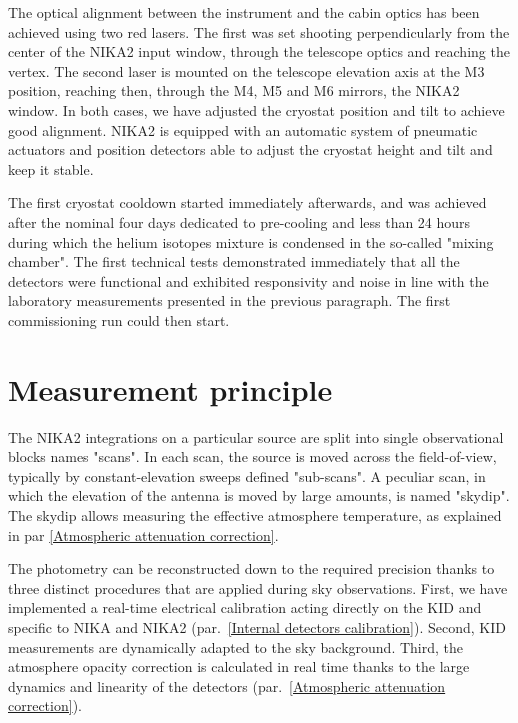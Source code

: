 \documentclass[]{aa} %
\begin{document}
The optical alignment between the instrument and the cabin optics has been achieved using two red lasers. The first was set shooting perpendicularly from the center of the NIKA2 input window, through the telescope optics and reaching the vertex. The second laser is mounted on the telescope elevation axis at the M3 position, reaching then, through the M4, M5 and M6 mirrors, the NIKA2 window. In both cases, we have adjusted the cryostat position and tilt to achieve good alignment. NIKA2 is equipped with an automatic system of pneumatic actuators and position detectors able to adjust the cryostat height and tilt and keep it stable. 

The first cryostat cooldown started immediately afterwards, and was achieved after the nominal four days dedicated to pre-cooling and less than 24 hours during which the helium isotopes mixture is condensed in the so-called "mixing chamber". The first technical tests demonstrated immediately that all the detectors were functional and exhibited responsivity and noise in line with the laboratory measurements presented in the previous paragraph. The first commissioning run could then start.







\section{Measurement principle}

The NIKA2 integrations on a particular source are split into single observational blocks names "scans". In each scan, the source is moved across the field-of-view, typically by constant-elevation sweeps defined "sub-scans". A peculiar scan, in which the elevation of the antenna is moved by large amounts, is named "skydip". The skydip allows measuring the effective atmosphere temperature, as explained in par \ref{Atmospheric attenuation correction}.

The photometry can be reconstructed down to the required precision thanks to three distinct procedures that are applied during sky observations. First, we have implemented a real-time electrical calibration acting directly on the KID and specific to NIKA and NIKA2 (par.~\ref{Internal detectors calibration}). Second, KID measurements are dynamically adapted to the sky background.
Third, the atmosphere opacity correction is calculated in real time thanks to the large dynamics and linearity of the detectors (par.~\ref{Atmospheric attenuation correction}).
\end{document}
